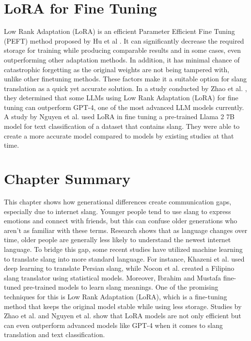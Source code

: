 \section{LoRA for Fine Tuning}
Low Rank Adaptation (LoRA) is an efficient Parameter Efficient Fine Tuning (PEFT) method proposed by Hu et al \cite{hu2021loralowrankadaptationlarge}.
It can significantly decrease the required storage for training while producing comparable results and in some cases, even outperforming other adaptation methods.
In addition, it has minimal chance of catastrophic forgetting as the original weights are not being tampered with, unlike other finetuning methods.
These factors make it a suitable option for slang translation as a quick yet accurate solution.
In a study conducted by Zhao et al. \cite{zhao2024loraland310finetuned}, they determined that some LLMs using Low Rank Adaptation (LoRA) for fine tuning can outperform GPT-4, one of the most advanced LLM models currently.
A study by Nguyen et al. \cite{nguyen2023finetuningllama2large} used LoRA in fine tuning a pre-trained Llama 2 7B model for text classification of a dataset that contains slang.
They were able to create a more accurate model compared to models by existing studies at that time. 

\section{Chapter Summary}
This chapter shows how generational differences create communication gaps, especially due to internet slang.
Younger people tend to use slang to express emotions and connect with friends, but this can confuse older generations who aren't as familiar with these terms.
Research shows that as language changes over time, older people are generally less likely to understand the newest internet language.
To bridge this gap, some recent studies have utilized machine learning to translate slang into more standard language.
For instance, Khazeni et al. \cite{Khazeni} used deep learning to translate Persian slang, while Nocon et al. \cite{Nocon_Kho_Arroyo_2018} created a Filipino slang translator using statistical models.
Moreover, Ibrahim and Mustafa \cite{Abdulstar_Ibrahim_Shareef_Mustafa_2023} fine-tuned pre-trained models to learn slang meanings.
One of the promising techniques for this is Low Rank Adaptation (LoRA), which is a fine-tuning method that keeps the original model stable while using less storage.
Studies by Zhao et al. \cite{zhao2024loraland310finetuned} and Nguyen et al. \cite{nguyen2023finetuningllama2large} show that LoRA models are not only efficient but can even outperform advanced models like GPT-4 when it comes to slang translation and text classification. 